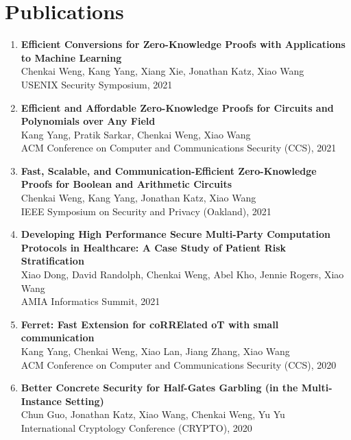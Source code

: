 \documentclass[letterpaper,11pt]{article}
\newcommand{\resumeSubHeadingListStart}{\begin{itemize}[leftmargin=0.15in, label={}]}
\begin{document}
\section{Publications}
\begin{enumerate}[leftmargin=0.20in]
  \item
          {\textbf{Efficient Conversions for Zero-Knowledge Proofs with Applications to Machine Learning}} \\
		{\small Chenkai Weng, Kang Yang, Xiang Xie, Jonathan Katz, Xiao Wang \vspace{-2pt}} \\
		{\small USENIX Security Symposium, 2021}
  \item
	  {\textbf{Efficient and Affordable Zero-Knowledge Proofs for Circuits and Polynomials over Any Field}} \\
		{\small Kang Yang, Pratik Sarkar, Chenkai Weng, Xiao Wang \vspace{-2pt}} \\
		{\small ACM Conference on Computer and Communications Security (CCS), 2021}
  \item
          {\textbf{Fast, Scalable, and Communication-Efficient Zero-Knowledge Proofs for Boolean and Arithmetic Circuits}} \\
		{\small Chenkai Weng, Kang Yang, Jonathan Katz, Xiao Wang \vspace{-2pt}} \\
		{\small IEEE Symposium on Security and Privacy (Oakland), 2021}
  \item
          {\textbf{Developing High Performance Secure Multi-Party Computation Protocols in Healthcare: A Case Study of Patient Risk Stratification}} \\
		{\small Xiao Dong, David Randolph, Chenkai Weng, Abel Kho, Jennie Rogers, Xiao Wang \vspace{-2pt}} \\
		{\small AMIA Informatics Summit, 2021}
  \item
          {\textbf{Ferret: Fast Extension for coRRElated oT with small communication}} \\
		{\small Kang Yang, Chenkai Weng, Xiao Lan, Jiang Zhang, Xiao Wang\vspace{-2pt}} \\
		{\small ACM Conference on Computer and Communications Security (CCS), 2020}
  \item
          {\textbf{Better Concrete Security for Half-Gates Garbling (in the Multi-Instance Setting)}} \\
		{\small Chun Guo, Jonathan Katz, Xiao Wang, Chenkai Weng, Yu Yu\vspace{-2pt}} \\ 
		{\small International Cryptology Conference (CRYPTO), 2020}
\end{enumerate}
\end{document}
